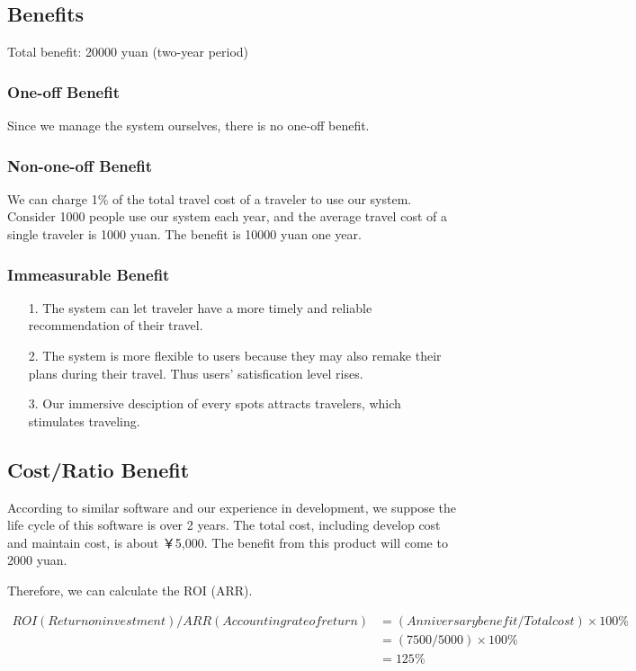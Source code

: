\documentclass[10pt]{article}
\begin{document}
\subsection{Benefits}
Total benefit: 20000 yuan (two-year period)
\subsubsection{One-off Benefit}
Since we manage the system ourselves, there is no one-off benefit. 

\subsubsection{Non-one-off Benefit}
We can charge 1\% of the total travel cost of a traveler to use our system. Consider 1000 people use our system each year, and the average travel cost of a single traveler is 1000 yuan. The benefit is 10000 yuan one year.

\subsubsection{Immeasurable Benefit}
\begin{itemize}
  \item[1.]	The system can let traveler have a more timely and reliable recommendation of their travel.
  \item[2.]	The system is more flexible to users because they may also remake their plans during their travel. Thus users’ satisfication level rises.
  \item[3.]	Our immersive desciption of every spots attracts travelers, which stimulates traveling.
  
\end{itemize}

\subsection{Cost/Ratio Benefit}
According to similar software and our experience in development, we suppose the life cycle of this software is over 2 years. The total cost, including develop cost and maintain cost, is about ￥5,000.  The benefit from this product will come to 2000 yuan.

Therefore, we can calculate the ROI (ARR).

\begin{align*}
  ROI (Return on investment)/ARR (Accounting rate of return)&=(Anniversary benefit / Total cost) \times 100\%\\
  &=(7500 / 5000) \times 100\%\\
  &=125\%
\end{align*}
\end{document}
